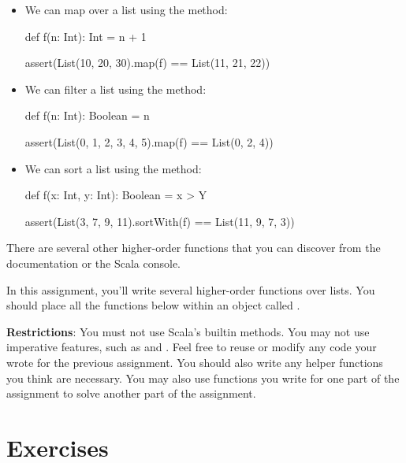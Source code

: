 \documentclass{book}
\begin{document}
\begin{itemize}

\item
We can map over a list using the  method:

\begin{scalacode}
def f(n: Int): Int = n + 1

assert(List(10, 20, 30).map(f) == List(11, 21, 22))
\end{scalacode}

\item We can filter a list using the  method:

\begin{scalacode}
def f(n: Int): Boolean = n %

assert(List(0, 1, 2, 3, 4, 5).map(f) == List(0, 2, 4))
\end{scalacode}

\item We can sort a list using the  method:

\begin{scalacode}
def f(x: Int, y: Int): Boolean = x > Y

assert(List(3, 7, 9, 11).sortWith(f) == List(11, 9, 7, 3))
\end{scalacode}

\end{itemize}

There are several other higher-order functions that you can discover from
the documentation or the Scala console.


In this assignment, you'll write several higher-order functions over lists. You
should place all the functions below within an object called
.

\textbf{Restrictions}: You must not use Scala's builtin methods. You
may not use imperative features, such as  and .
Feel free to reuse or modify any code your wrote for the previous assignment.
You should also write any helper functions you think are necessary. You
may also use functions you write for one part of the assignment to solve
another part of the assignment.

\section{Exercises}
\end{document}
